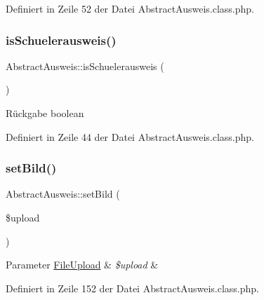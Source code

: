 Definiert in Zeile 52 der Datei Abstract\+Ausweis.\+class.\+php.

\mbox{\label{class_abstract_ausweis_af3fcb96804b4317592ef070c6b34b75f}} 
\subsubsection{\texorpdfstring{is\+Schuelerausweis()}{isSchuelerausweis()}}
{\footnotesize\ttfamily Abstract\+Ausweis\+::is\+Schuelerausweis (\begin{DoxyParamCaption}{ }\end{DoxyParamCaption})}

\begin{DoxyReturn}{Rückgabe}
boolean 
\end{DoxyReturn}


Definiert in Zeile 44 der Datei Abstract\+Ausweis.\+class.\+php.

\mbox{\label{class_abstract_ausweis_a1049ecee1f431f98fdfdec695bc15e9d}} 
\subsubsection{\texorpdfstring{set\+Bild()}{setBild()}}
{\footnotesize\ttfamily Abstract\+Ausweis\+::set\+Bild (\begin{DoxyParamCaption}\item[{}]{\$upload }\end{DoxyParamCaption})}


\begin{DoxyParams}[1]{Parameter}
\mbox{\hyperlink{class_file_upload}{File\+Upload}} & {\em \$upload} & \\
\hline
\end{DoxyParams}


Definiert in Zeile 152 der Datei Abstract\+Ausweis.\+class.\+php.

\mbox{\label{class_abstract_ausweis_a83fd93f15ff8af50519bcb45bae2afdb}} 
